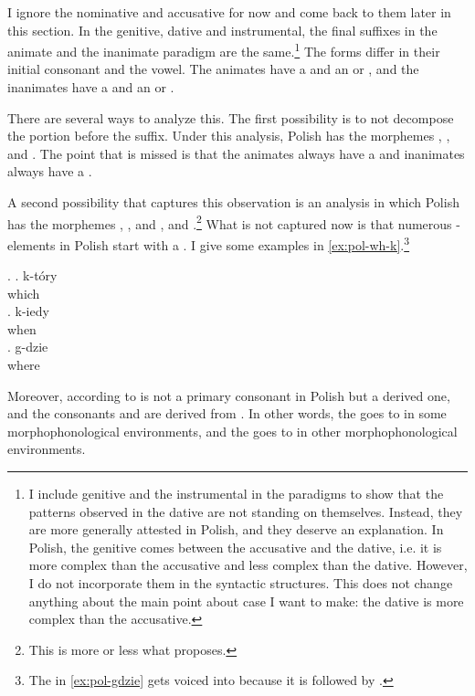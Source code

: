 I ignore the nominative and accusative for now and come back to them later in this section.
In the genitive, dative and instrumental, the final suffixes in the animate and the inanimate paradigm are the same.\footnote{
I include genitive and the instrumental in the paradigms to show that the patterns observed in the dative are not standing on themselves. Instead, they are more generally attested in Polish, and they deserve an explanation.
In Polish, the genitive comes between the accusative and the dative, i.e. it is more complex than the accusative and less complex than the dative. However, I do not incorporate them in the syntactic structures.
This does not change anything about the main point about case I want to make: the dative is more complex than the accusative.
}
The forms differ in their initial consonant and the vowel. The animates have a  and an  or , and the inanimates have a  and an  or .

There are several ways to analyze this.
The first possibility is to not decompose the portion before the suffix. Under this analysis, Polish has the morphemes , ,  and . The point that is missed is that the animates always have a  and inanimates always have a .

A second possibility that captures this observation is an analysis in which Polish has the morphemes , ,  and ,  and .\footnote{
This is more or less what \citet{wiland2019} proposes.
}
What is not captured now is that numerous -elements in Polish start with a . I give some examples in \ref{ex:pol-wh-k}.\footnote{
The  in \ref{ex:pol-gdzie} gets voiced into  because it is followed by .
}

\ex.\label{ex:pol-wh-k}
\ag. k-tóry\\
 which\\
\bg. k-iedy\\
 when\\
\bg. g-dzie\\
 where\\\label{ex:pol-gdzie}

Moreover, according to   is not a primary consonant in Polish but a derived one, and the consonants  and  are derived from . In other words, the  goes to  in some morphophonological environments, and the  goes to  in other morphophonological environments.

